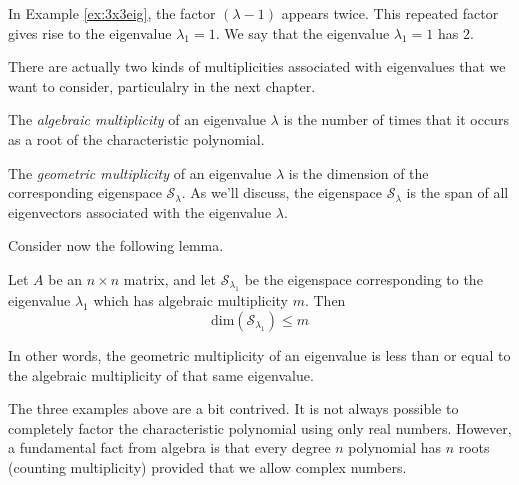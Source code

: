 \documentclass{ximera}
\begin{document}
In Example \ref{ex:3x3eig}, the factor  $(\lambda-1)$ appears twice.  This repeated factor gives rise to the eigenvalue $\lambda_1=1$.  We say that the eigenvalue $\lambda_1=1$ has  $2$.

There are actually two kinds of multiplicities associated with eigenvalues that we want to consider, particulalry in the next chapter. 

\begin{definition}\label{def:geommulteig}

The \emph{algebraic multiplicity} of an eigenvalue $\lambda$ is the number of times that it occurs as a root of the characteristic polynomial.

The \emph{geometric multiplicity} of an eigenvalue $\lambda$ is the dimension of the corresponding eigenspace $\mathcal{S}_\lambda$. As we'll discuss, the eigenspace $\mathcal{S}_\lambda$ is the span of all eigenvectors associated with the eigenvalue $\lambda$.
\end{definition}

Consider now the following lemma.

\begin{lemma}\label{lemma:dimeigenspace}
Let $A$ be an $n\times n$ matrix, and let $\mathcal{S}_{\lambda_1}$ be the eigenspace corresponding to the eigenvalue $\lambda_1$ which has algebraic multiplicity $m$.  Then
$$\mbox{dim}(\mathcal{S}_{\lambda_1})\leq m$$
\end{lemma}

In other words, the geometric multiplicity of an eigenvalue is less than or equal to the algebraic multiplicity of that same eigenvalue.

    
The three examples above are a bit contrived.  It is not always possible to completely factor the characteristic polynomial using only real numbers.  However, a fundamental fact from algebra is that every degree $n$ polynomial has $n$ roots (counting multiplicity) provided that we allow complex numbers.
    
\end{document}
